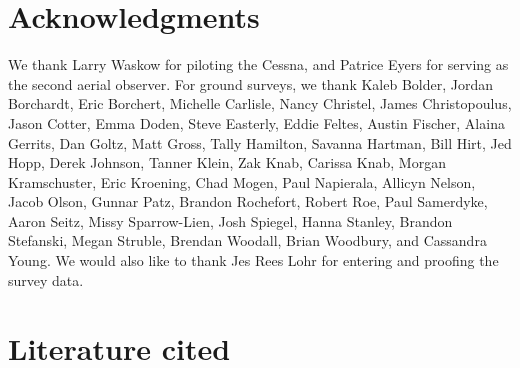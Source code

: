 \documentclass[
  12pt,
]{article}
\begin{document}
\newpage

\hypertarget{acknowledgments}{%
\section{Acknowledgments}\label{acknowledgments}}

We thank Larry Waskow for piloting the Cessna, and Patrice Eyers for
serving as the second aerial observer. For ground surveys, we thank
Kaleb Bolder, Jordan Borchardt, Eric Borchert, Michelle Carlisle, Nancy
Christel, James Christopoulus, Jason Cotter, Emma Doden, Steve Easterly,
Eddie Feltes, Austin Fischer, Alaina Gerrits, Dan Goltz, Matt Gross,
Tally Hamilton, Savanna Hartman, Bill Hirt, Jed Hopp, Derek Johnson,
Tanner Klein, Zak Knab, Carissa Knab, Morgan Kramschuster, Eric
Kroening, Chad Mogen, Paul Napierala, Allicyn Nelson, Jacob Olson,
Gunnar Patz, Brandon Rochefort, Robert Roe, Paul Samerdyke, Aaron Seitz,
Missy Sparrow-Lien, Josh Spiegel, Hanna Stanley, Brandon Stefanski,
Megan Struble, Brendan Woodall, Brian Woodbury, and Cassandra Young. We
would also like to thank Jes Rees Lohr for entering and proofing the
survey data.

\newpage

\hypertarget{literature-cited}{%
\section{Literature cited}\label{literature-cited}}
\end{document}
